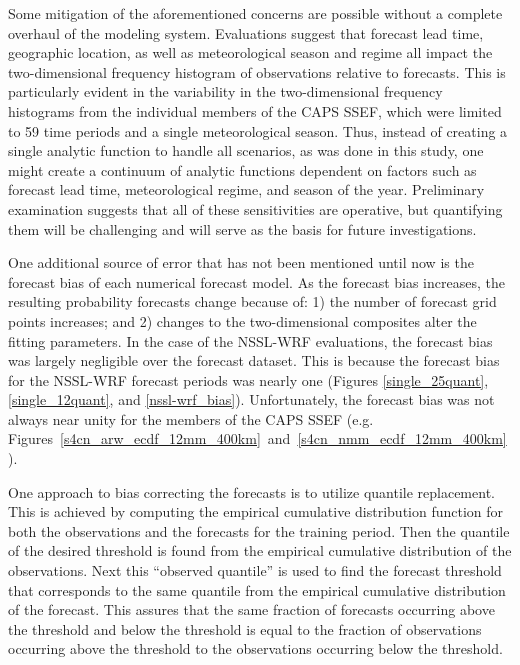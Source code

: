 Some mitigation of the aforementioned concerns are possible without a complete overhaul of the modeling system.
Evaluations suggest that forecast lead time, geographic location, as well as meteorological season and regime all impact the two-dimensional frequency histogram of observations relative to forecasts.
This is particularly evident in the variability in the two-dimensional frequency histograms from the individual members of the CAPS SSEF, which were limited to 59 time periods and a single meteorological season.
Thus, instead of creating a single analytic function to handle all scenarios, as was done in this study, one might create a continuum of analytic functions dependent on factors such as forecast lead time, meteorological regime, and season of the year.
Preliminary examination suggests that all of these sensitivities are operative, but quantifying them will be challenging and will serve as the basis for future investigations.


One additional source of error that has not been mentioned until now is the forecast bias of each numerical forecast model.
As the forecast bias increases, the resulting probability forecasts change because of: 1) the number of forecast grid points increases; and 2) changes to the two-dimensional composites alter the fitting parameters.
In the case of the NSSL-WRF evaluations, the forecast bias was largely negligible over the forecast dataset.
This is because the forecast bias for the NSSL-WRF forecast periods was nearly one (Figures \ref{single_25quant}, \ref{single_12quant}, and \ref{nssl-wrf_bias}).
Unfortunately, the forecast bias was not always near unity for the members of the CAPS SSEF (e.g. \mbox{Figures \ref{s4cn_arw_ecdf_12mm_400km} and \ref{s4cn_nmm_ecdf_12mm_400km}}).


One approach to bias correcting the forecasts is to utilize quantile replacement.
This is achieved by computing the empirical cumulative distribution function for both the observations and the forecasts for the training period.
Then the quantile of the desired threshold is found from the empirical cumulative distribution of the observations.
Next this ``observed quantile'' is used to find the forecast threshold that corresponds to the same quantile from the empirical cumulative distribution of the forecast.
This assures that the same fraction of forecasts occurring above the threshold and below the threshold is equal to the fraction of observations occurring above the threshold to the observations occurring below the threshold.



